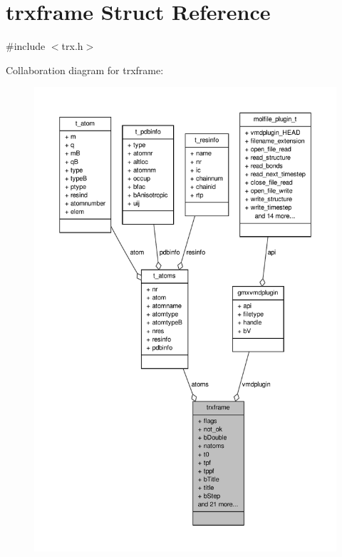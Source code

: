 \hypertarget{structtrxframe}{\section{trxframe \-Struct \-Reference}
\label{structtrxframe}
}


{\ttfamily \#include $<$trx.\-h$>$}



\-Collaboration diagram for trxframe\-:
\nopagebreak
\begin{figure}[H]
\begin{center}
\leavevmode
\includegraphics[width=350pt]{structtrxframe__coll__graph}
\end{center}
\end{figure}
